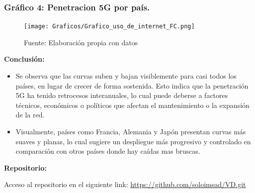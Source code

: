 \documentclass[12pt, a4paper]{article}
\begin{document}
\subsubsection*{Gráfico 4: Penetracion 5G por país.}
\begin{figure}[H]
    \centering
    \texttt{[image: Graficos/Grafico\_uso\_de\_internet\_FC.png]}
    \caption[6]{Fuente: Elaboración propia con datos}

\end{figure}


\textbf{Conclusión:}  
\begin{itemize}
    \item Se observa que las curvas suben y bajan visiblemente para casi todos los países, en lugar de crecer de forma sostenida. Esto indica que la penetración 5G ha tenido retrocesos interanuales, lo cual puede deberse a factores técnicos, económicos o políticos que afectan el mantenimiento o la expansión de la red.
    \item Visualmente, países como Francia, Alemania y Japón presentan curvas más suaves y planas, lo cual sugiere un despliegue más progresivo y controlado en comparación con otros países donde hay caídas mas bruscas.

\end{itemize}


\textbf{Repositorio:}  
\label{anexo:repositorio}

Acceso al repositorio en el siguiente link: 
\url{https://github.com/soloimsad/VD.git}
\end{document}

